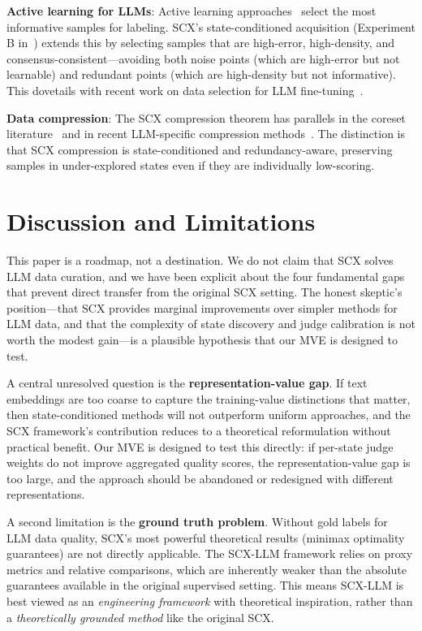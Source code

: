 \documentclass[11pt,twocolumn]{article}
\begin{document}
\textbf{Active learning for LLMs}: Active learning approaches~\cite{zhang2022active,dorr2022active,mindermann2022prioritized} select the most informative samples for labeling. SCX's state-conditioned acquisition (Experiment B in~\cite{scx2026}) extends this by selecting samples that are high-error, high-density, and consensus-consistent---avoiding both noise points (which are high-error but not learnable) and redundant points (which are high-density but not informative). This dovetails with recent work on data selection for LLM fine-tuning~\cite{xia2024less,choe2024loga}.

\textbf{Data compression}: The SCX compression theorem has parallels in the coreset literature~\cite{feldman2013turning,ceylan2022coreset,borsos2024mindsmall} and in recent LLM-specific compression methods~\cite{brown2024best,marion2024pruning}. The distinction is that SCX compression is state-conditioned and redundancy-aware, preserving samples in under-explored states even if they are individually low-scoring.

\section{Discussion and Limitations}

This paper is a roadmap, not a destination. We do not claim that SCX solves LLM data curation, and we have been explicit about the four fundamental gaps that prevent direct transfer from the original SCX setting. The honest skeptic's position---that SCX provides marginal improvements over simpler methods for LLM data, and that the complexity of state discovery and judge calibration is not worth the modest gain---is a plausible hypothesis that our MVE is designed to test.

A central unresolved question is the \textbf{representation-value gap}. If text embeddings are too coarse to capture the training-value distinctions that matter, then state-conditioned methods will not outperform uniform approaches, and the SCX framework's contribution reduces to a theoretical reformulation without practical benefit. Our MVE is designed to test this directly: if per-state judge weights do not improve aggregated quality scores, the representation-value gap is too large, and the approach should be abandoned or redesigned with different representations.

A second limitation is the \textbf{ground truth problem}. Without gold labels for LLM data quality, SCX's most powerful theoretical results (minimax optimality guarantees) are not directly applicable. The SCX-LLM framework relies on proxy metrics and relative comparisons, which are inherently weaker than the absolute guarantees available in the original supervised setting. This means SCX-LLM is best viewed as an \textit{engineering framework} with theoretical inspiration, rather than a \textit{theoretically grounded method} like the original SCX.
\end{document}
